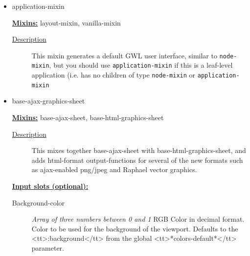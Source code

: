 \documentclass [11pt]{book}
\begin{document}
\begin{itemize}

\item {}application-mixin


\textbf{
\underline{Mixins:}} layout-mixin, vanilla-mixin





\begin{description}

\item [
\underline{Description}]


This mixin generates a default GWL user interface, similar to \texttt{node-mixin}, but you should use
\texttt{application-mixin} if this is a leaf-level application (i.e. has no children of type \texttt{node-mixin}
or \texttt{application-mixin}



\end{description}









\item {}base-ajax-graphics-sheet


\textbf{
\underline{Mixins:}} base-ajax-sheet, base-html-graphics-sheet





\begin{description}

\item [
\underline{Description}]


This mixes together base-ajax-sheet 
with base-html-graphics-sheet, and adds html-format output-functions 
for several of the new formats such as ajax-enabled png/jpeg and 
Raphael vector graphics.



\end{description}








\textbf{
\underline{Input slots (optional):}}

\begin{description}

\item [Background-color]
\emph{Array of three numbers between 0 and 1} RGB Color in decimal
format. Color to be used for the background of the viewport.
Defaults to the
<tt>:background</tt> from the global <tt>*colors-default*</tt> parameter.



\end{description}
\end{itemize}
\end{document}
